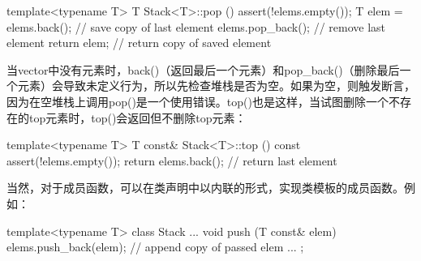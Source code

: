 \begin{cpp}
template<typename T>
T Stack<T>::pop ()
{
	assert(!elems.empty());
	T elem = elems.back(); // save copy of last element
	elems.pop_back(); // remove last element
	return elem; // return copy of saved element
}
\end{cpp}

当vector中没有元素时，back()（返回最后一个元素）和pop\_back()（删除最后一个元素）会导致未定义行为，所以先检查堆栈是否为空。如果为空，则触发断言，因为在空堆栈上调用pop()是一个使用错误。top()也是这样，当试图删除一个不存在的top元素时，top()会返回但不删除top元素：

\begin{cpp}
template<typename T>
T const& Stack<T>::top () const
{
	assert(!elems.empty());
	return elems.back(); // return last element
}
\end{cpp}

当然，对于成员函数，可以在类声明中以内联的形式，实现类模板的成员函数。例如：

\begin{cpp}
template<typename T>
class Stack {
	...
	void push (T const& elem) {
		elems.push_back(elem); // append copy of passed elem
	}
	...
};
\end{cpp}






